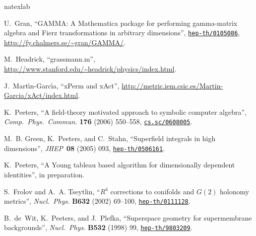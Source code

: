\documentclass[11pt]{article}
\begin{document}
%
%
\begingroup\raggedright\begin{thebibliography}{8}
\expandafter\ifx\csname natexlab\endcsname\relax\def\natexlab#1{#1}\fi

U.~Gran, ``{GAMMA}: A {Mathematica} package for performing gamma-matrix algebra
  and {Fierz} transformations in arbitrary dimensions'',
  \href{http://xxx.lanl.gov/abs/hep-th/0105086}{{\tt hep-th/0105086}},
\url{http://fy.chalmers.se/~gran/GAMMA/}.

M.~Headrick, ``grassmann.m'',
  \url{http://www.stanford.edu/~headrick/physics/index.html}.

J.~{Mart\'\i{}n-Garc\'\i{}a}, ``{xPerm and xAct}'',
  \url{http://metric.iem.csic.es/Martin-Garcia/xAct/index.html}.

K.~Peeters, ``A field-theory motivated approach to symbolic computer algebra'',
  {\em Comp.\ Phys.\ Commun.} {\bf 176} (2006) 550--558,
  \href{http://xxx.lanl.gov/abs/cs.sc/0608005}{{\tt cs.sc/0608005}}.

M.~B. Green, K.~Peeters, and C.~Stahn, ``Superfield integrals in high
  dimensions'', {\em JHEP\,} {\bf 08} (2005) 093,
\href{http://xxx.lanl.gov/abs/hep-th/0506161}{{\tt hep-th/0506161}}.

K.~Peeters, ``A {Young} tableau based algorithm for dimensionally dependent
  identities'', in preparation.

S.~Frolov and A.~A. Tseytlin, ``{$R^4$ corrections to conifolds and $G(2)$
  holonomy metrics}'', {\em Nucl.\ Phys.} {\bf B632} (2002) 69--100,
\href{http://xxx.lanl.gov/abs/hep-th/0111128}{{\tt hep-th/0111128}}.

B.~de~Wit, K.~Peeters, and J.~Plefka, ``Superspace geometry for supermembrane
  backgrounds'', {\em Nucl.\ Phys.} {\bf B532} (1998) 99,
\href{http://xxx.lanl.gov/abs/hep-th/9803209}{{\tt hep-th/9803209}}.

\end{thebibliography}\endgroup
\end{document}
